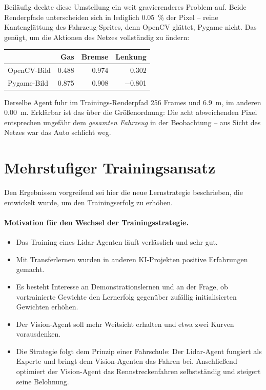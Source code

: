 Beiläufig deckte diese Umstellung ein weit gravierenderes Problem auf. Beide Renderpfade unterscheiden sich in lediglich \SI{0.05}{\percent} der Pixel -- reine Kantenglättung des Fahrzeug-Sprites, denn OpenCV glättet, Pygame nicht. Das genügt, um die Aktionen des Netzes vollständig zu ändern:
\begin{center}
\begin{tabular}{@{}l r r r@{}}
  \toprule
                  & \textbf{Gas} & \textbf{Bremse} & \textbf{Lenkung} \\
  \midrule
  OpenCV-Bild     & \num{0.488}  & \num{0.974}     & \num{+0.302} \\
  Pygame-Bild     & \num{0.875}  & \num{0.908}     & \num{-0.801} \\
  \bottomrule
\end{tabular}
\end{center}
Derselbe Agent fuhr im Trainings-Renderpfad \num{256} Frames und \SI{6.9}{\meter}, im anderen \SI{0.00}{\meter}. Erklärbar ist das über die Größenordnung: Die acht abweichenden Pixel entsprechen ungefähr dem \emph{gesamten Fahrzeug} in der Beobachtung -- aus Sicht des Netzes war das Auto schlicht weg.

\section{Mehrstufiger Trainingsansatz}
\label{subsec:mehrstufiges_training}
Den Ergebnissen vorgreifend sei hier die neue Lernstrategie beschrieben, die entwickelt wurde, um den Trainingserfolg zu erhöhen.

\paragraph{Motivation für den Wechsel der Trainingsstrategie.}
\begin{itemize}
  \item Das Training eines Lidar-Agenten läuft verlässlich und sehr gut.
  \item Mit Transferlernen wurden in anderen KI-Projekten positive Erfahrungen gemacht.
  \item Es besteht Interesse an Demonstrationslernen und an der Frage, ob vortrainierte Gewichte den Lernerfolg gegenüber zufällig initialisierten Gewichten erhöhen.
  \item Der Vision-Agent soll mehr Weitsicht erhalten und etwa zwei Kurven vorausdenken.
  \item Die Strategie folgt dem Prinzip einer Fahrschule: Der Lidar-Agent fungiert als Experte und bringt dem Vision-Agenten das Fahren bei. Anschließend optimiert der Vision-Agent das Rennstreckenfahren selbstständig und steigert seine Belohnung.
\end{itemize}

